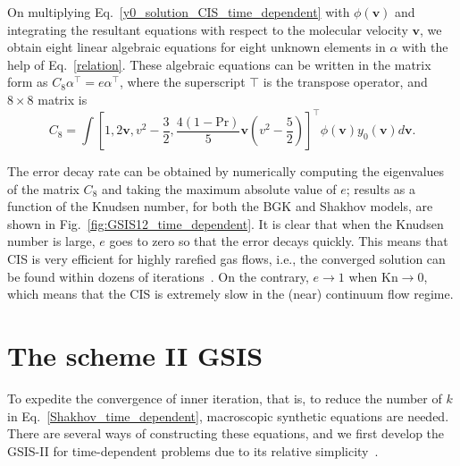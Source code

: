 \documentclass[onefignum,onetabnum]{siamart171218}
\newcommand{\leir}[1]{{\leavevmode\color{red}#1}}
\begin{document}
On multiplying Eq.~\eqref{y0_solution_CIS_time_dependent} with $\phi(\bm{v})$ and integrating the resultant equations with respect to the molecular velocity $\bm{v}$, we obtain eight linear algebraic equations for eight unknown elements in $\alpha$ with the help of Eq.~\eqref{relation}. These algebraic equations can be written in the matrix form as
$
C_8\alpha^\top=e\alpha^\top$, 
where the superscript $\top$ is the transpose operator, and
$8\times8$ matrix is
\begin{equation}
C_8=\int \left[1,2\bm{v},v^2-\frac{3}{2},\frac{4(1-\text{Pr})}{5}\bm{v}\left(v^2-\frac{5}{2}\right)
\right]^\top \phi(\bm{v})y_0(\bm{v})d\bm{v}.
\end{equation}

The error decay rate can be obtained by numerically computing the eigenvalues of the matrix $C_8$ and taking the maximum absolute value of $e$;  results as a function of the Knudsen number, for both the BGK and Shakhov models, are shown in Fig.~\ref{fig:GSIS12_time_dependent}. It is clear that when the Knudsen number  is large, $e$ goes to zero so that the error decays quickly. This means that CIS is very efficient for highly rarefied gas flows, i.e., the converged solution can be found within dozens of iterations~\cite{SuArXiv2019}. On the contrary, $e\rightarrow1$ when $\text{Kn}\rightarrow0$, which means that the CIS is extremely slow in the (near) continuum flow regime. 







\section{The scheme II GSIS}\label{section_GSIS2}

To expedite the convergence of inner iteration, that is, to reduce the number of $k$ in Eq.~\eqref{Shakhov_time_dependent}, macroscopic synthetic equations are needed. There are several ways of constructing these equations, and we first develop the GSIS-II for time-dependent problems due to its relative simplicity~\cite{Zhu2021JCP}. 
\end{document}

